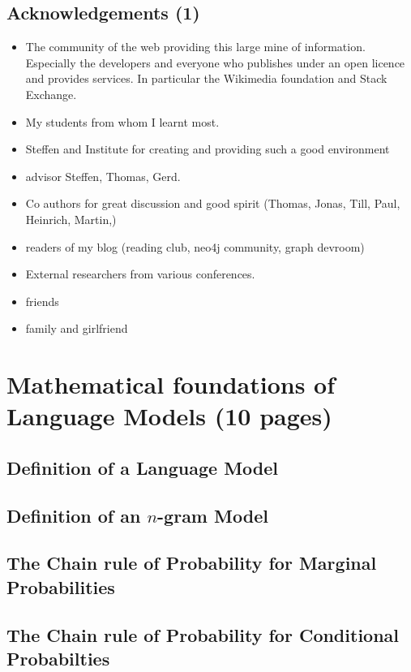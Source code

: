 \documentclass[•]{book}
\begin{document}
\section{Acknowledgements (1)}
\begin{itemize}
\item The community of the web providing this large mine of information. Especially the developers and everyone who publishes under an open licence and provides services. In particular the Wikimedia foundation and Stack Exchange. 
\item My students from whom I learnt most.
\item Steffen and Institute for creating and providing such a good environment
\item advisor Steffen, Thomas, Gerd.
\item Co authors for great discussion and good spirit (Thomas, Jonas, Till, Paul, Heinrich, Martin,)
\item readers of my blog (reading club, neo4j community, graph devroom)
\item External researchers from various conferences.\item friends
\item family and girlfriend

\end{itemize}

\chapter{Mathematical foundations of Language Models (10 pages)}
\section{Definition of a Language Model}
\section{Definition of an $n$-gram Model}
\section{The Chain rule of Probability for Marginal Probabilities}
\section{The Chain rule of Probability for Conditional Probabilties}
\end{document}
